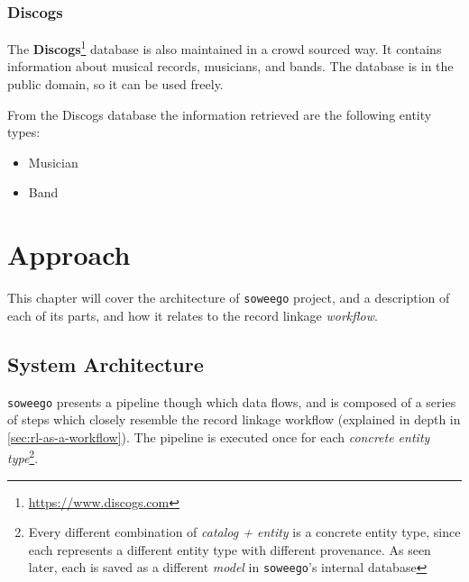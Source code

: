 \documentclass[epsfig,a4paper,11pt,titlepage,twoside,openany]{book}
\newcommand{\footurl}[1]{\footnote{\url{#1}}}
\newcommand{\soweego}[0]{\texttt{soweego}\xspace}
\begin{document}
\subsection{Discogs}
\label{sec:catalog-discogs}


The \textbf{Discogs}\footurl{https://www.discogs.com} database is also maintained in a crowd sourced way. It contains information about musical records, musicians, and bands. The database is in the public domain, so it can be used freely.

From the Discogs database the information retrieved are the following entity types:

\begin{itemize}
\item Musician
\item Band
\end{itemize}


\chapter{Approach}
\label{chap:approach}

This chapter will cover the architecture of \soweego project, and a description of each of its parts, and how it relates to the record linkage \textit{workflow}.

\section{System Architecture}
\label{sec:system-architecture}


\texttt{soweego} presents a pipeline though which data flows, and is composed of a series of steps which closely resemble the record linkage workflow (explained in depth in \autoref{sec:rl-as-a-workflow}). The pipeline is executed once for each \textit{concrete entity type}\footnote{Every different combination of \textit{catalog + entity}  is a concrete entity type, since each represents a different entity type with different provenance. As seen later, each is saved as a different \textit{model} in \texttt{soweego}'s internal database}.
\end{document}
